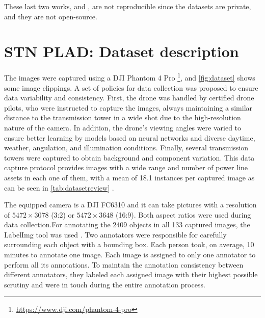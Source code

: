 \documentclass[10pt,conference]{IEEEtran}
\begin{document}
These last two works, \cite{kong2018context} and \cite{zhu2018multi}, are not reproducible since the datasets are private, and they are not open-source.


\section{STN PLAD: Dataset description}




\label{sec:dataset}


The images were captured using a DJI Phantom 4 Pro \footnote{\url{https://www.dji.com/phantom-4-pro}}, and \autoref{fig:dataset} shows some image clippings. A set of policies for data collection was proposed to ensure data variability and consistency. First, the drone was handled by certified drone pilots, who were instructed to capture the images, always maintaining a similar distance to the transmission tower in a wide shot due to the high-resolution nature of the camera. In addition, the drone's viewing angles were varied to ensure better learning by models based on neural networks and diverse daytime, weather, angulation, and illumination conditions. Finally, several transmission towers were captured to obtain background and component variation. This data capture protocol provides images with a wide range and number of power line assets in each one of them, with a mean of 18.1 instances per captured image as can be seen in \autoref{tab:datasetreview} .

The equipped camera is a DJI FC6310 and it can take pictures with a resolution of $5472\times3078$ (3:2) or $5472\times3648$ (16:9). Both aspect ratios were used during data collection.For annotating the 2409 objects in all 133 captured images, the LabelImg tool was used \cite{tzutalin2015labelimg}. Two annotators were responsible for carefully surrounding each object with a bounding box. Each person took, on average, 10 minutes to annotate one image. Each image is assigned to only one annotator to perform all its annotations. To maintain the annotation consistency between different annotators, they labeled each assigned image with their highest possible scrutiny and were in touch during the entire annotation process. 
\end{document}
